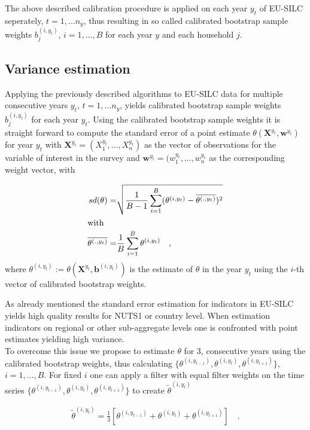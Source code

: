 \documentclass{scrartcl}
\begin{document}
The above described calibration procedure is applied on each year $y_t$ of EU-SILC seperately, $t=1,\ldots n_y$, thus resulting in so called calibrated bootstrap sample weights $b_{j}^{(i,{y_t})}$, $i=1,\ldots,B$ for each year $y$ and each household $j$.

\subsection{Variance estimation}
Applying the previously described algorithms to EU-SILC data for multiple consecutive years $y_t$, $t=1,\ldots n_y$, yields calibrated bootstrap sample weights $b_{j}^{(i,{y_t})}$ for each year $y_t$. Using the calibrated bootstrap sample weights it is straight forward to compute the standard error of a point estimate $\theta(\textbf{X}^{y_t},\textbf{w}^{y_t})$ for year $y_t$ with $\textbf{X}^{y_t}=(X_1^{y_t},\ldots,X_n^{y_t})$ as the vector of observations for the variable of interest in the survey and $\textbf{w}^{y_t}=(w_1^{y_t},\ldots,w_n^{y_t}$ as the corresponding weight vector, with

\begin{align*}
  sd(\theta) =& \sqrt{\frac{1}{B-1}\sum\limits_{i=1}^B (\theta^{(i,y_t)}-\overline{\theta^{(.,y_t)}})^2} \\
\intertext{with}
  \overline{\theta^{(.,y_t)}} =& \frac{1}{B}\sum\limits_{i=1}^B\theta^{(i,y_t)} \quad,
\end{align*}
where $\theta^{(i,y_t)}:=\theta(\textbf{X}^{y_t},\textbf{b}^{(i,{y_t})})$ is the estimate of $\theta$ in the year $y_t$ using the $i$-th vector of calibrated bootstrap weights.

As already mentioned the standard error estimation for indicators in EU-SILC yields high quality results for NUTS1 or country level. When estimation indicators on regional or other sub-aggregate levels one is confronted with point estimates yielding high variance.\\

To overcome this issue we propose to estimate $\theta$ for 3, consecutive years using the calibrated bootstrap weights, thus calculating $\{\theta^{(i,y_{t-1})},\theta^{(i,y_t)},\theta^{(i,y_{t+1})}\}$, $i=1,\ldots,B$.
For fixed $i$ one can apply a filter with equal filter weights on the time series $\{\theta^{(i,y_{t-1})},\theta^{(i,y_t)},\theta^{(i,y_{t+1})}\}$ to create $\tilde{\theta}^{(i,y_t)}$

\begin{align*}
  \tilde{\theta}^{(i,y_t)} = \frac{1}{3}\left[\theta^{(i,y_{t-1})}+\theta^{(i,y_t)}+\theta^{(i,y_{t+1})}\right] \quad .
\end{align*}
\end{document}
